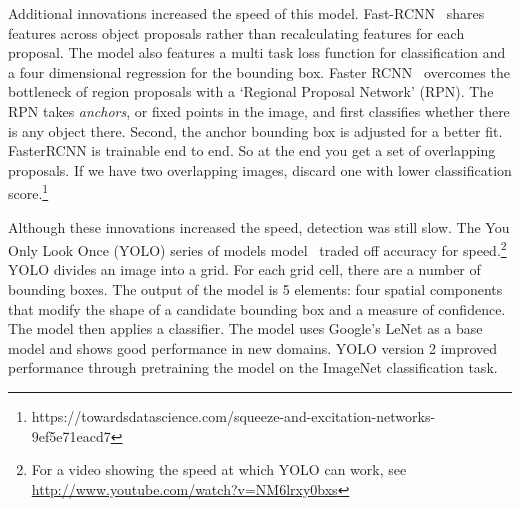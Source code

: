 \documentclass[12pt, a4paper, oneside, headinclude, footinclude]{article}
\begin{document}
Additional innovations increased the speed of this model.
Fast-RCNN~\cite{Gershick2015} shares features across object proposals rather
than recalculating features for each proposal. The model also features a multi
task loss function for classification and a four dimensional regression for
the bounding box. Faster RCNN~\cite{Ren2017} overcomes the bottleneck of
region proposals with a `Regional Proposal Network' (RPN). The RPN takes
\textit{anchors}, or fixed points in the image, and first classifies whether
there is any object there.  Second, the anchor bounding box is adjusted for a
better fit. FasterRCNN is trainable end to end. So at the end you get a set of
overlapping proposals. If we have two overlapping images, discard one with
lower classification
score.\footnote{https://towardsdatascience.com/squeeze-and-excitation-networks-9ef5e71eacd7}











Although these innovations increased the speed, detection was still slow. The
You Only Look Once (YOLO) series of models model~\cite{redmon2016yolo} traded
off accuracy for speed.\footnote{For a video showing the speed at which YOLO
can work, see \url{http://www.youtube.com/watch?v=NM6lrxy0bxs}} YOLO divides
an image into a grid. For each grid cell, there are a number of bounding
boxes. The output of the model is 5 elements: four spatial components that
modify the shape of a candidate bounding box and a measure of confidence.  The
model then applies a classifier. The model uses Google's LeNet as a base model
and shows good performance in new domains. YOLO version 2 improved performance
through pretraining the model on the ImageNet classification task.
\end{document}
